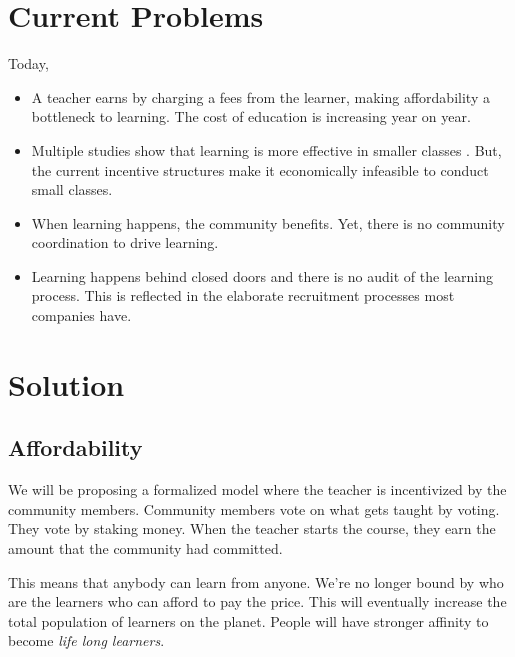\documentclass{article}
\begin{document}
  \section{Current Problems} %
    Today,
    \begin{itemize}
      \item A teacher earns by charging a fees from the learner, making affordability a bottleneck to learning. The cost of education is increasing year on year. \cite{feesincrease}
      \item Multiple studies show that learning is more effective in smaller classes \cite{starresearch}. 
        But, the current incentive structures make it economically infeasible to conduct small classes. %
      \item When learning happens, the community benefits. Yet, there is no community coordination to drive learning. %
      \item Learning happens behind closed doors and there is no audit of the learning process. This is reflected in the elaborate recruitment processes most companies have. \cite{roundsofinterviewcount}
    \end{itemize}

  \section{Solution}
    \subsection{Affordability}
      We will be proposing a formalized model where the teacher is incentivized by the community members. Community members vote on what gets taught by voting. They vote by staking money. When the teacher starts the course, they earn the amount that the community had committed.
      \par
      This means that anybody can learn from anyone. We're no longer bound by who are the learners who can afford to pay the price. This will eventually increase the total population of learners on the planet. People will have stronger affinity to become \textit{life long learners}.
\end{document}
